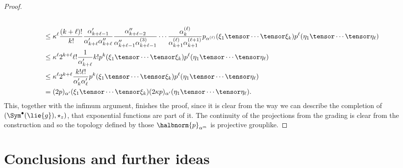 \documentclass[
11pt,                          %
english                        %
]{article}
\begin{document}
\begin{proof}
\begin{align*}
		\\
		& \leq
		\kappa^\ell
		\frac{(k + \ell)!}{k!}
		\frac{\alpha_{k + \ell - 1}'}{\alpha_{k + \ell}' \alpha_{k+\ell}''}
		\frac{\alpha_{k + \ell - 2}''}
		{\alpha_{k + \ell - 1}'' \alpha_{k+\ell-1}^{(3)}}
		\cdots
		\frac{\alpha_{k}^{(\ell)}}
		{\alpha_{k + 1}^{(\ell)} \alpha_{k+1}^{(\ell + 1)}}
		p_{\alpha^{(\ell)}} (\xi_1 \tensor \cdots \tensor \xi_k)
		p^\ell ( \eta_1 \tensor \cdots \tensor \eta_\ell )
		\\
		& \leq
		\kappa^\ell
		2^{k + \ell}
		\ell!
		\frac{1}{\alpha_{k + \ell}'}
		k!
		p^k (\xi_1 \tensor \cdots \tensor \xi_k)
		p^\ell ( \eta_1 \tensor \cdots \tensor \eta_\ell )
		\\
		& \leq
		\kappa^\ell
		2^{k + \ell}
		\frac{k! \ell!}{\alpha_k' \alpha_\ell '}
		p^k (\xi_1 \tensor \cdots \tensor \xi_k)
		p^\ell ( \eta_1 \tensor \cdots \tensor \eta_\ell )
		\\
		&=
		(2p)_{\alpha'} (\xi_1 \tensor \cdots \tensor \xi_k)
		(2 \kappa p)_{\alpha'} ( \eta_1 \tensor \cdots \tensor \eta_\ell ).
	\end{align*}
	This, together with the infimum argument, finishes the proof, since it is clear 
	from the way we can describe the completion of $\left( \Sym^{\bullet}(\lie{g}), 
	\star_z \right)$, that exponential functions are part of it. The continuity of 
	the projections from the grading is clear from the construction and so the 
	topology defined by those $\halbnorm{p}_{\alpha^{m}}$ is projective grouplike.
\end{proof}



\section{Conclusions and further ideas}
\end{document}
